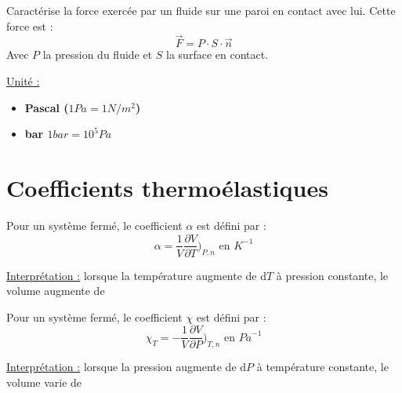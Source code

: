 \documentclass[12pt]{article}
\theoremstyle{cstyle}{\newtheorem{definition}{Définition}[section]}
\theoremstyle{cstyle}{\newtheorem{proposition}[definition]{Propriété}}
\theoremstyle{mystyle}{\newtheorem{theorem}[definition]{Théorème}}
\theoremstyle{mystyle}{\newtheorem{lemma}[definition]{Lemme}}
\theoremstyle{mystyle}{\newtheorem{corollary}[definition]{Corollaire}}
\theoremstyle{mystyle}{\newtheorem*{remark}{Remarque}}
\theoremstyle{mystyle}{\newtheorem*{remarks}{Remarques}}
\theoremstyle{mystyle}{\newtheorem*{example}{Exemple}}
\theoremstyle{mystyle}{\newtheorem*{examples}{Exemples}}
\theoremstyle{definition}{\newtheorem*{exercise}{Exercice}}
\theoremstyle{mystyle}{\newtheorem*{methode}{Méthode}}
\theoremstyle{cstyle}{\newtheorem*{cthm}{}}
\theoremstyle{warn}
\begin{document}
\newpage
\begin{minipage}[t]{0.45\textwidth}
	
	\begin{definition}[Pression]
		Caractérise la force exercée par un fluide sur une paroi en contact avec lui. Cette force est :
		\[ \vec{F} = P \cdot S \cdot \vec{n} \]
		Avec $P$ la pression du fluide et $S$ la surface en contact.
		
		\underline{Unité :} \begin{itemize}
			\item \textbf{Pascal (\(1Pa = 1N/m^2\))} 	
			\item \textbf{bar \(1bar = 10^5 Pa\)}
		\end{itemize}	
	\end{definition}

	\section{Coefficients thermoélastiques}
	
	\begin{definition}
		Pour un système fermé, le coefficient $\alpha$ est défini par :
		\[
		\alpha = \frac{1}{V} \frac{\partial V}{\partial T}\Big)_{P,n} \text{ en } K^{-1}
		\]
		
		\underline{Interprétation :} lorsque la température augmente de d$T$ à pression constante, le volume augmente de 
	\end{definition}

	\begin{definition}
		Pour un système fermé, le coefficient $\chi$ est défini par :
		\[
		\chi_T = -\frac{1}{V} \frac{\partial V}{\partial P}\Big)_{T,n} \text{ en } {Pa}^{-1}
		\]
		
		\underline{Interprétation :} lorsque la pression augmente de d$P$ à température constante, le volume varie de 
	\end{definition}

	
	

\end{minipage}
\hfill
\vrule
\hfill
\end{document}
